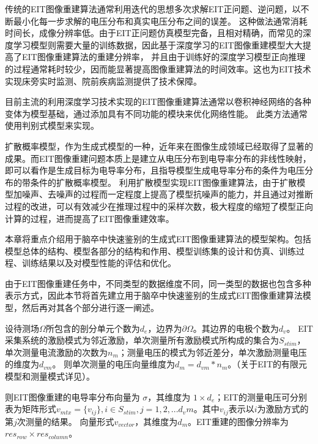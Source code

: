 
传统的EIT图像重建算法通常利用迭代的思想多次求解EIT正问题、逆问题，以不断最小化每一步求解的电压分布和真实电压分布之间的误差。
这种做法通常消耗时间长，成像分辨率低。由于EIT正问题仿真模型完备，且相对精确，而常见的深度学习模型则需要大量的训练数据，因此基于深度学习的EIT图像重建模型大大提高了EIT图像重建算法的重建分辨率，
并且由于训练好的深度学习模型正向推理的过程通常耗时较少，因而能显著提高图像重建算法的时间效率。这也为EIT技术实现床旁实时监测、院前疾病监测提供了技术保障。

目前主流的利用深度学习技术实现的EIT图像重建算法通常以卷积神经网络的各种变体为模型基础，通过添加具有不同功能的模块来优化网络性能。
此类方法通常使用判别式模型来实现。

扩散概率模型，作为生成式模型的一种，近年来在图像生成领域已经取得了显著的成果。而EIT图像重建问题本质上是建立从电压分布到电导率分布的非线性映射，
即可以看作是生成目标为电导率分布，且指导模型生成电导率分布的条件为电压分布的带条件的扩散概率模型。
利用扩散模型实现EIT图像重建算法，由于扩散模型加噪声、去噪声的过程而一定程度上提高了模型抗噪声的能力，并且通过对推断过程的改进，可以有效减少在推理过程中的采样次数，极大程度的缩短了模型正向计算的过程，进而提高了EIT图像重建效率。

本章将重点介绍用于脑卒中快速鉴别的生成式EIT图像重建算法的模型架构。包括模型总体的结构、模型各部分的结构和作用、模型训练集的设计和仿真、训练过程、训练结果以及对模型性能的评估和优化。


\label{section:Model}
由于EIT图像重建任务中，不同类型的数据维度不同，同一类型的数据也包含多种表示方式，因此本节将首先建立用于脑卒中快速鉴别的生成式EIT图像重建算法模型，然后再对其各个部分进行逐一阐述。

设待测场$\Omega$所包含的剖分单元个数为$d_e$，边界为$\partial \Omega$。其边界的电极个数为$d_v$。
EIT采集系统的激励模式为邻近激励，单次测量所有激励模式所构成的集合为$S_{stim}$，单次测量电流激励的次数为$n_m$；测量电压的模式为邻近差分，单次激励测量电压的维度为$d_{vm}$。
则单次测量的电压向量维度为$d_m = d_{vm} * n_m$。（关于EIT的有限元模型和测量模式详见）。

则EIT图像重建的电导率分布向量为 $\sigma$，其维度为 $1 \times d_e$；EIT的测量电压可分别表为矩阵形式$v_{mtx} = \{v_{ij}\}, i \in S_{stim}, j =1,2,...d_vm$。其中$v_{ij}$表示以$i$为激励方式的第$j$次测量的结果。
向量形式$v_{vector}$，其维度为$d_m$。EIT重建的图像分辨率为$res_{row} \times res_{column}$。

